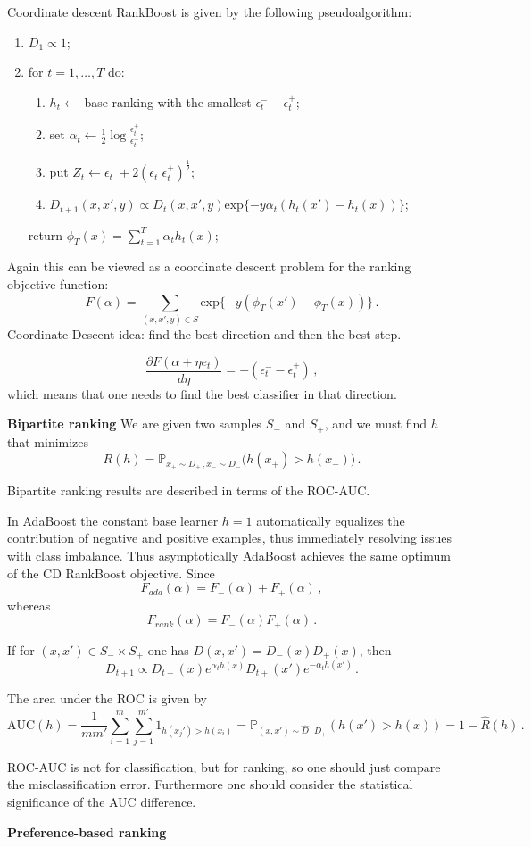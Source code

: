 \documentclass[a4paper]{article}
\newcommand{\pr}{\mathbb{P}}
\begin{document}
Coordinate descent RankBoost is given by the following pseudoalgorithm:
\begin{enumerate}
    \item $D_1\propto 1$;
    \item for $t=1,\ldots, T$ do: \begin{enumerate}
        \item $h_t\leftarrow $ base ranking with the smallest $\epsilon^-_t-\epsilon^+_t$;
        \item set $\alpha_t \leftarrow \frac{1}{2}\log\frac{\epsilon^+_t}{\epsilon^-_t}$;
        \item put $Z_t \leftarrow \epsilon^-_t + 2(\epsilon^-_t\epsilon^+_t)^\frac{1}{2}$;
        \item $D_{t+1}(x,x',y) \propto D_t(x,x',y) \text{exp} \{ -y\alpha_t(h_t(x')-h_t(x)) \}$;
    \end{enumerate}
    return $\phi_T(x) = \sum_{t=1}^T \alpha_t h_t(x)$;
\end{enumerate}

Again this can be viewed as a coordinate descent problem for the ranking objective
function:
\[ F(\alpha) = \sum_{(x,x',y)\in S} \text{exp}\{-y(\phi_T(x')-\phi_T(x))\} \,. \]
Coordinate Descent idea: find the best direction and then the best step.

\[\frac{\partial F(\alpha + \eta e_t)}{d \eta}
    = -(\epsilon^-_t - \epsilon^+_t) \,,\]
which means that one needs to find the best classifier in that direction.

\textbf{Bipartite ranking} We are given two samples $S_-$ and $S_+$, and
we must find $h$ that minimizes
\[R(h) = \pr_{x_+\sim D_+\,,x_-\sim D_-} \bigl( h(x_+) > h(x_-) \bigr) \,. \]

Bipartite ranking results are described in terms of the ROC-AUC.

In AdaBoost the constant base learner $h=1$ automatically equalizes the contribution
of negative and positive examples, thus immediately resolving issues with class
imbalance. Thus asymptotically AdaBoost achieves the same optimum of the CD RankBoost
objective.
Since
\[F_{ada}(\alpha) = F_-(\alpha) + F_+(\alpha)\,,\]
whereas
\[F_{rank}(\alpha) = F_-(\alpha) F_+(\alpha)\,.\]

If for $(x,x')\in S_-\times S_+$ one has $D(x,x') = D_-(x) D_+(x)$, then
\[ D_{t+1} \propto D_{t-}(x) e^{\alpha_t h(x)} D_{t+}(x') e^{-\alpha_t h(x')}
    \,. \]

The area under the ROC is given by
\[ \text{AUC}(h)
    = \frac{1}{mm'}\sum_{i=1}^m \sum_{j=1}^{m'} 1_{h(x_j') > h(x_i)}
    = \pr_{(x,x')\sim \hat{D}_-\hat{D}_+}(h(x') > h(x))
    = 1 - \hat{R}(h)
    \,. \]

ROC-AUC is not for classification, but for ranking, so one should just compare the
misclassification error. Furthermore one should consider the statistical significance
of the AUC difference.

\textbf{Preference-based ranking} 



%
\end{document}
